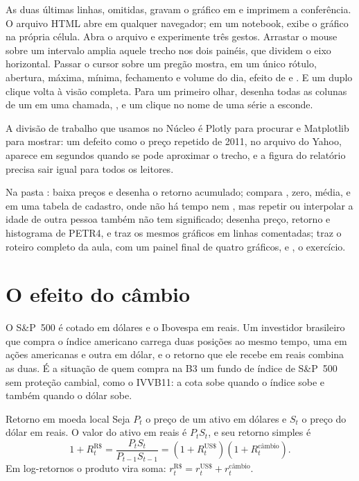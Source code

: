 As duas últimas linhas, omitidas, gravam o gráfico em  e imprimem a conferência. O arquivo HTML abre em qualquer navegador; em um notebook,  exibe o gráfico na própria célula. Abra o arquivo e experimente três gestos. Arrastar o mouse sobre um intervalo amplia aquele trecho nos dois painéis, que dividem o eixo horizontal. Passar o cursor sobre um pregão mostra, em um único rótulo, abertura, máxima, mínima, fechamento e volume do dia, efeito de  e . E um duplo clique volta à visão completa. Para um primeiro olhar,  desenha todas as colunas de um  em uma chamada, , e um clique no nome de uma série a esconde.

A divisão de trabalho que usamos no Núcleo é Plotly para procurar e Matplotlib para mostrar: um defeito como o preço repetido de 2011, no arquivo do Yahoo, aparece em segundos quando se pode aproximar o trecho, e a figura do relatório precisa sair igual para todos os leitores.

\begin{repositorio}
Na pasta :  baixa preços e desenha o retorno acumulado;  compara , zero, média,  e  em uma tabela de cadastro, onde não há tempo nem , mas repetir ou interpolar a idade de outra pessoa também não tem significado;  desenha preço, retorno e histograma de PETR4, e  traz os mesmos gráficos em linhas comentadas;  traz o roteiro completo da aula, com um painel final de quatro gráficos, e , o exercício.
\end{repositorio}

\section{O efeito do câmbio}
\label{sec:c02-cambio}

O S\&P~500 é cotado em dólares e o Ibovespa em reais. Um investidor brasileiro que compra o índice americano carrega duas posições ao mesmo tempo, uma em ações americanas e outra em dólar, e o retorno que ele recebe em reais combina as duas. É a situação de quem compra na B3 um fundo de índice de S\&P~500 sem proteção cambial, como o IVVB11: a cota sobe quando o índice sobe e também quando o dólar sobe.

\begin{resultado}{Retorno em moeda local}
Seja $P_t$ o preço de um ativo em dólares e $S_t$ o preço do dólar em reais. O valor do ativo em reais é $P_t S_t$, e seu retorno simples é
\begin{equation}
  1 + R^{\text{R\$}}_t = \frac{P_t S_t}{P_{t-1} S_{t-1}} = \left(1 + R^{\text{US\$}}_t\right)\left(1 + R^{\text{câmbio}}_t\right) .
  \label{eq:c02-cambio}
\end{equation}
Em log-retornos o produto vira soma: $r^{\text{R\$}}_t = r^{\text{US\$}}_t + r^{\text{câmbio}}_t$.
\end{resultado}


